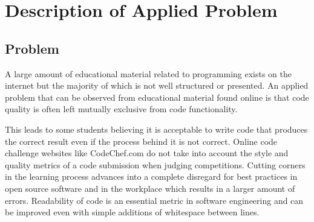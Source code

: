 \documentclass{article}
\begin{document}


\begin{abstract} 
{\bf Discovering the effects of code style on code functionality and problem
structure.} This study aims to showcase how well formatted, reusable and
maintainable code is fundamentally better in all circumstances by
looking at over 1 million results from a competitive programming website
and analyzing the correlation between question and solution. The goal is
to promote code quality checking in online `just in time' teaching
resources to improve the performance of interviewers, researchers, and
students. \end{abstract} 


\section{Description of Applied
Problem}\label{description-of-applied-problem}

\subsection{Problem}\label{problem}

A large amount of educational material related to programming exists on
the internet but the majority of which is not well structured or
presented. An applied problem that can be observed from educational
material found online is that code quality is often left mutually
exclusive from code functionality. \citet{justintimeteaching}

This leads to some students believing it is acceptable to write code
that produces the correct result even if the process behind it is not
correct. Online code challenge websites like CodeChef.com do not take
into account the style and quality metrics of a code submission when
judging competitions. \citet{codechef} Cutting corners in the learning
process advances into a complete disregard for best practices in open
source software and in the workplace which results in a larger amount of
errors. Readability of code is an essential metric in software
engineering and can be improved even with simple additions of whitespace
between lines. \citet{codereadability}
\end{document}
